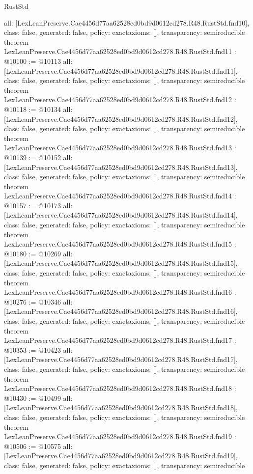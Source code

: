\begin{lexlean}{RustStd}
\begin{coremodule}
{  all: [LexLeanPreserve.Cae4456d77aa62528ed0bd9d0612cd278.R48.RustStd.fnd10],
  class: false,
  generated: false,
  policy: exact{axioms: []},
  transparency: semireducible
}
theorem LexLeanPreserve.Cae4456d77aa62528ed0bd9d0612cd278.R48.RustStd.fnd11 : @10100 := @10113 {
  all: [LexLeanPreserve.Cae4456d77aa62528ed0bd9d0612cd278.R48.RustStd.fnd11],
  class: false,
  generated: false,
  policy: exact{axioms: []},
  transparency: semireducible
}
theorem LexLeanPreserve.Cae4456d77aa62528ed0bd9d0612cd278.R48.RustStd.fnd12 : @10118 := @10134 {
  all: [LexLeanPreserve.Cae4456d77aa62528ed0bd9d0612cd278.R48.RustStd.fnd12],
  class: false,
  generated: false,
  policy: exact{axioms: []},
  transparency: semireducible
}
theorem LexLeanPreserve.Cae4456d77aa62528ed0bd9d0612cd278.R48.RustStd.fnd13 : @10139 := @10152 {
  all: [LexLeanPreserve.Cae4456d77aa62528ed0bd9d0612cd278.R48.RustStd.fnd13],
  class: false,
  generated: false,
  policy: exact{axioms: []},
  transparency: semireducible
}
theorem LexLeanPreserve.Cae4456d77aa62528ed0bd9d0612cd278.R48.RustStd.fnd14 : @10157 := @10173 {
  all: [LexLeanPreserve.Cae4456d77aa62528ed0bd9d0612cd278.R48.RustStd.fnd14],
  class: false,
  generated: false,
  policy: exact{axioms: []},
  transparency: semireducible
}
theorem LexLeanPreserve.Cae4456d77aa62528ed0bd9d0612cd278.R48.RustStd.fnd15 : @10180 := @10269 {
  all: [LexLeanPreserve.Cae4456d77aa62528ed0bd9d0612cd278.R48.RustStd.fnd15],
  class: false,
  generated: false,
  policy: exact{axioms: []},
  transparency: semireducible
}
theorem LexLeanPreserve.Cae4456d77aa62528ed0bd9d0612cd278.R48.RustStd.fnd16 : @10276 := @10346 {
  all: [LexLeanPreserve.Cae4456d77aa62528ed0bd9d0612cd278.R48.RustStd.fnd16],
  class: false,
  generated: false,
  policy: exact{axioms: []},
  transparency: semireducible
}
theorem LexLeanPreserve.Cae4456d77aa62528ed0bd9d0612cd278.R48.RustStd.fnd17 : @10353 := @10423 {
  all: [LexLeanPreserve.Cae4456d77aa62528ed0bd9d0612cd278.R48.RustStd.fnd17],
  class: false,
  generated: false,
  policy: exact{axioms: []},
  transparency: semireducible
}
theorem LexLeanPreserve.Cae4456d77aa62528ed0bd9d0612cd278.R48.RustStd.fnd18 : @10430 := @10499 {
  all: [LexLeanPreserve.Cae4456d77aa62528ed0bd9d0612cd278.R48.RustStd.fnd18],
  class: false,
  generated: false,
  policy: exact{axioms: []},
  transparency: semireducible
}
theorem LexLeanPreserve.Cae4456d77aa62528ed0bd9d0612cd278.R48.RustStd.fnd19 : @10506 := @10575 {
  all: [LexLeanPreserve.Cae4456d77aa62528ed0bd9d0612cd278.R48.RustStd.fnd19],
  class: false,
  generated: false,
  policy: exact{axioms: []},
  transparency: semireducible
}
\end{coremodule}
\end{lexlean}
